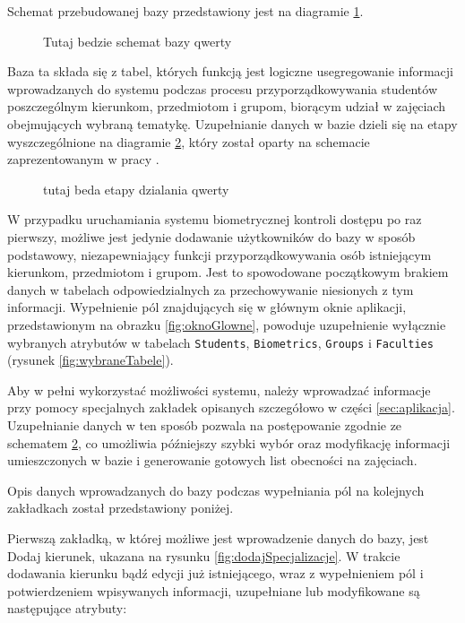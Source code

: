 Schemat przebudowanej bazy przedstawiony jest na diagramie \ref{fig:bazaDanych}.

 
\begin{figure}
\begin{center}
\caption{Tutaj bedzie schemat bazy qwerty}
\label{fig:bazaDanych}
\end{center}
\end{figure}

Baza ta składa się z tabel, których funkcją jest logiczne usegregowanie informacji wprowadzanych do systemu podczas procesu przyporządkowywania studentów poszczególnym kierunkom, przedmiotom i grupom, biorącym udział w zajęciach obejmujących wybraną tematykę. Uzupełnianie danych w bazie dzieli się na etapy wyszczególnione na diagramie \ref{fig:etapyDzialania}, który został oparty na schemacie zaprezentowanym w pracy \cite{Gl11}.

\begin{figure}
\begin{center}
\caption{tutaj beda etapy dzialania qwerty}
\label{fig:etapyDzialania}
\end{center}
\end{figure}

W przypadku uruchamiania systemu biometrycznej kontroli dostępu po raz pierwszy, możliwe jest jedynie dodawanie użytkowników do bazy w sposób podstawowy, niezapewniający funkcji przyporządkowywania osób istniejącym kierunkom, przedmiotom i grupom. Jest to spowodowane początkowym brakiem danych w tabelach odpowiedzialnych za przechowywanie niesionych z tym informacji. Wypełnienie pól znajdujących się w głównym oknie aplikacji, przedstawionym na obrazku \ref{fig:oknoGlowne}, powoduje uzupełnienie wyłącznie wybranych atrybutów w tabelach \verb!Students!, \verb!Biometrics!, \verb!Groups! i \verb!Faculties! (rysunek \ref{fig:wybraneTabele}). 

Aby w pełni wykorzystać możliwości systemu, należy wprowadzać informacje przy pomocy specjalnych zakładek opisanych szczegółowo w części \ref{sec:aplikacja}. Uzupełnianie danych w ten sposób pozwala na postępowanie zgodnie ze schematem \ref{fig:etapyDzialania}, co umożliwia późniejszy szybki wybór oraz modyfikację informacji umieszczonych w bazie i generowanie gotowych list obecności na zajęciach.

Opis danych wprowadzanych do bazy podczas wypełniania pól na kolejnych zakładkach został przedstawiony poniżej.

Pierwszą zakładką, w której możliwe jest wprowadzenie danych do bazy, jest Dodaj kierunek, ukazana na rysunku \ref{fig:dodajSpecjalizacje}. W trakcie dodawania kierunku bądź edycji już istniejącego, wraz z wypełnieniem pól i potwierdzeniem wpisywanych informacji, uzupełniane lub modyfikowane są następujące atrybuty:

